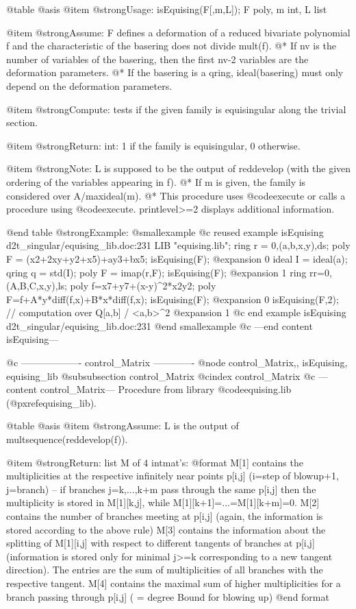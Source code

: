 @table @asis
@item @strong{Usage:}
isEquising(F[,m,L]); F poly, m int, L list

@item @strong{Assume:}
F defines a deformation of a reduced bivariate polynomial f
and the characteristic of the basering does not divide mult(f). @*
If nv is the number of variables of the basering, then the first
nv-2 variables are the deformation parameters. @*
If the basering is a qring, ideal(basering) must only depend
on the deformation parameters.

@item @strong{Compute:}
tests if the given family is equisingular along the trivial
section.

@item @strong{Return:}
int: 1 if the family is equisingular, 0 otherwise.

@item @strong{Note:}
L is supposed to be the output of reddevelop (with the given ordering
of the variables appearing in f). @*
If m is given, the family is considered over A/maxideal(m). @*
This procedure uses @code{execute} or calls a procedure using
@code{execute}.
printlevel>=2 displays additional information.

@end table
@strong{Example:}
@smallexample
@c reused example isEquising d2t_singular/equising_lib.doc:231 
LIB "equising.lib";
ring r = 0,(a,b,x,y),ds;
poly F = (x2+2xy+y2+x5)+ay3+bx5;
isEquising(F);
@expansion{} 0
ideal I = ideal(a);
qring q = std(I);
poly F = imap(r,F);
isEquising(F);
@expansion{} 1
ring rr=0,(A,B,C,x,y),ls;
poly f=x7+y7+(x-y)^2*x2y2;
poly F=f+A*y*diff(f,x)+B*x*diff(f,x);
isEquising(F);  
@expansion{} 0
isEquising(F,2);    // computation over  Q[a,b] / <a,b>^2
@expansion{} 1
@c end example isEquising d2t_singular/equising_lib.doc:231
@end smallexample
@c ---end content isEquising---

@c ------------------- control_Matrix -------------
@node control_Matrix,, isEquising, equising_lib
@subsubsection control_Matrix
@cindex control_Matrix
@c ---content control_Matrix---
Procedure from library @code{equising.lib} (@pxref{equising_lib}).

@table @asis
@item @strong{Assume:}
L is the output of multsequence(reddevelop(f)).

@item @strong{Return:}
list M of 4 intmat's:
@format
  M[1] contains the multiplicities at the respective infinitely near points 
       p[i,j] (i=step of blowup+1, j=branch) -- if branches j=k,...,k+m pass 
       through the same p[i,j] then the multiplicity is stored in M[1][k,j], 
       while M[1][k+1]=...=M[1][k+m]=0.   
  M[2] contains the number of branches meeting at p[i,j] (again, the information 
       is stored according to the above rule)   
  M[3] contains the information about the splitting of M[1][i,j] with respect to 
       different tangents of branches at p[i,j] (information is stored only for 
       minimal j>=k corresponding to a new tangent direction). 
       The entries are the sum of multiplicities of all branches with the 
       respective tangent.
  M[4] contains the maximal sum of higher multiplicities for a branch passing 
       through p[i,j] ( = degree Bound for blowing up)  
@end format

